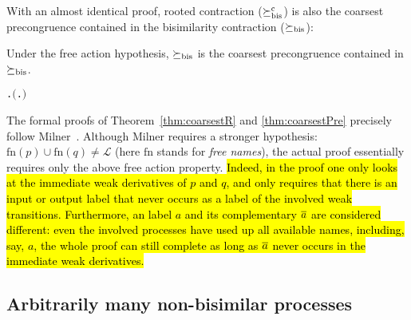 With an almost identical proof, rooted contraction
($\mathrel{\succeq^{\rm{c}}_{\rm{bis}}}$) is also the coarsest
precongruence contained in the bisimilarity contraction ($\mathrel{\succeq_{\rm{bis}}}$):
\begin{theorem}
  \label{thm:coarsestPre}
  Under the free action hypothesis, $\mathrel{\succeq_{\rm{bis}}}$ is the coarsest precongruence contained in $\mathrel{\succeq_{\rm{bis}}}$.
\begin{alltt}
\HOLTokenTurnstile{} \HOLSymConst{\HOLTokenForall{}} .   \HOLSymConst{\HOLTokenConj{}}   \HOLSymConst{\HOLTokenImp{}} \ensuremath{(}\HOLSymConst{\HOLTokenForall{}}.  \HOLSymConst{\ensuremath{+}}  \HOLSymConst{\HOLTokenContracts{}}  \HOLSymConst{\ensuremath{+}} \ensuremath{)} \HOLSymConst{\HOLTokenImp{}}  \HOLSymConst{\HOLTokenObsContracts} 
\end{alltt}
\end{theorem}

The formal proofs of Theorem~\ref{thm:coarsestR} and
\ref{thm:coarsestPre} precisely follow Milner~\citep[p.~153--154]{Mil89}.
Although Milner requires a stronger hypothesis: $\mathrm{fn}(p) \cup
\mathrm{fn}(q) \neq \mathscr{L}$ (here $\mathrm{fn}$ stands for \emph{free
  names}), the actual proof essentially requires only the above
free action property.
\hl{Indeed, in the proof one only looks at the immediate weak
derivatives of $p$ and $q$, and only requires that there is an input
or output label that never occurs as a label of the involved weak transitions.
Furthermore, an label $a$ and its complementary $\overline{a}$ are
considered different: even the involved processes have used up all
available names, including, say, $a$, the whole proof can still complete as
long as $\overline{a}$ never occurs in the immediate weak
derivatives.}

\subsection{Arbitrarily many non-bisimilar processes}
\label{ss:arbitrarily}


